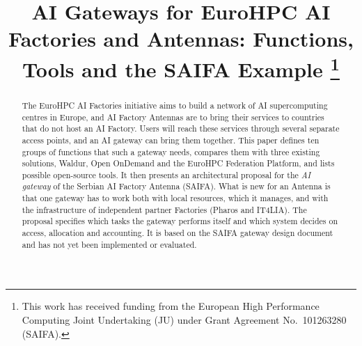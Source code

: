 \documentclass[conference,a4paper]{IEEEtran}
\newif\ifizmene
\DeclareRobustCommand{\chg}[1]{\ifizmene{\color{blue}#1}\else#1\fi}
\DeclareRobustCommand{\roz}[1]{\ifizmene{\color{roze}#1}\else#1\fi}
\DeclareRobustCommand{\nov}[1]{\ifizmene{\color{nova}#1}\else#1\fi}
\DeclareRobustCommand{\tri}[1]{\ifizmene{\color{treca}#1}\else#1\fi}
\begin{document}
\title{AI Gateways for EuroHPC AI Factories and Antennas: Functions, Tools and the SAIFA Example%
\thanks{This work has received funding from the European High Performance Computing Joint Undertaking (JU) under Grant Agreement No.~101263280 (SAIFA).}}

\author{
\and
{}
\and
{}
}

\maketitle
{}

\begin{abstract}
The EuroHPC AI Factories initiative \nov{aims to build} a network of AI supercomputing centres in Europe, and AI Factory Antennas \nov{are to} bring their services to countries \nov{that do not host an AI Factory}. \nov{Users will reach these services through several separate access points, and an AI gateway can bring them together. This paper defines ten groups of functions that such a gateway needs,} \chg{compares them with} \roz{three existing solutions,} \chg{Waldur, Open OnDemand and the EuroHPC Federation Platform,} \nov{and lists possible open-source tools. It then presents an architectural proposal for the \emph{AI gateway} of the Serbian AI Factory Antenna (SAIFA). What is new for an Antenna is that one gateway has to work both with local resources, which it manages, and with the infrastructure of independent partner Factories (Pharos and IT4LIA). The proposal specifies which tasks the gateway performs itself and which system decides on access, allocation and accounting. It is based on the SAIFA \tri{gateway} design \tri{document} and has not yet been implemented or evaluated.}
\end{abstract}
\end{document}
